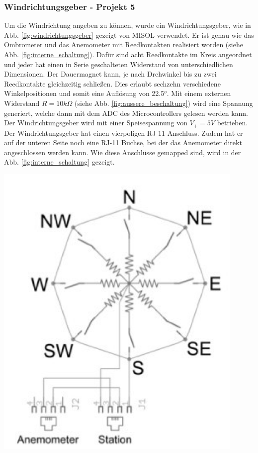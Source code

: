 \subsubsection{Windrichtungsgeber - Projekt 5}
{\begin{minipage}[b][10cm][t]{0.55\textwidth}
Um die Windrichtung angeben zu können, wurde ein Windrichtungsgeber, wie in Abb. \ref{fig:windrichtungsgeber} gezeigt von MISOL verwendet. Er ist genau wie das Ombrometer und das Anemometer mit Reedkontakten realisiert worden (siehe Abb. \ref{fig:interne_schaltung}). Dafür sind acht Reedkontakte im Kreis angeordnet und jeder hat einen in Serie geschalteten Widerstand von unterschiedlichen Dimensionen. Der Dauermagnet kann, je nach Drehwinkel bis zu zwei Reedkontakte gleichzeitig schließen. Dies erlaubt sechzehn verschiedene Winkelpositionen und somit eine Auflösung von 22.5$^{o}$. Mit einem externen Widerstand $R=10k\Omega$ (siehe Abb. \ref{fig:aussere_beschaltung}) wird eine Spannung generiert, welche dann mit dem ADC des Microcontrollers gelesen werden kann. Der Windrichtungsgeber wird mit einer Speisespannung von $V_{+}=5V$ betrieben. Der Windrichtungsgeber hat einen vierpoligen RJ-11 Anschluss. Zudem hat er auf der unteren Seite noch eine RJ-11 Buchse, bei der das Anemometer direkt angeschlossen werden kann. Wie diese Anschlüsse gemapped sind, wird in der Abb. \ref{fig:interne_schaltung} gezeigt. \\
\end{minipage}}
{\begin{minipage}[b][10cm][t]{0.44\textwidth}
\centering
\includegraphics[width=0.9\textwidth]{graphics/windrichtungsgeber/interne_schaltung.PNG}
\label{fig:interne_schaltung}
\end{minipage}}

